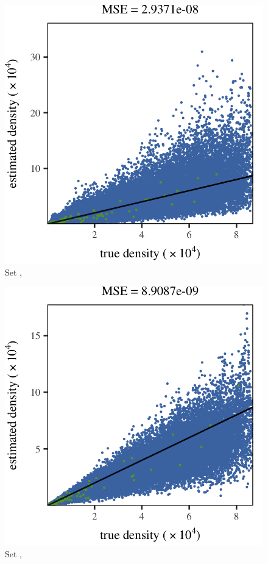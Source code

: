 \begin{subfigure}{0.3\textwidth}
	\centering
	\includegraphics[keepaspectratio=true, width=\textwidth, height=0.23\textheight]{result/img/results_baakman_4_60000_mbe_silverman}
	\caption{Set \baakmanFour, \mbe}
	\label{fig:results:singlesphere:mbe:baakman4}
\end{subfigure}	
\begin{subfigure}{0.3\textwidth}
	\centering
	\includegraphics[keepaspectratio=true, width=\textwidth, height=0.23\textheight]{result/img/results_ferdosi_1_60000_sambe_silverman}
	\caption{Set \ferdosiOne, \sambe}
	\label{fig:results:singlesphere:sambe:ferdosi1}
\end{subfigure}

